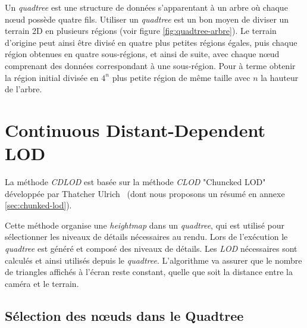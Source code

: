  Un \emph{quadtree} est une structure de données s'apparentant à un arbre où chaque n\oe{}ud possède quatre fils. Utiliser un \emph{quadtree} est un bon moyen de diviser un terrain 2D en plusieurs régions (voir figure \ref{fig:quadtree-arbre}). Le terrain d'origine peut ainsi être divisé en quatre plus petites régions égales, puis chaque région obtenues en quatre sous-régions, et ainsi de suite, avec chaque n\oe{}ud comprenant des données correspondant à une sous-région. Pour à terme obtenir la région initial divisée en $4^n$ plus petite région de même taille avec $n$ la hauteur de l'arbre.

  
\vspace{1.5cm}

\section{Continuous Distant-Dependent LOD}


  La méthode \textit{CDLOD} est basée sur la méthode \textit{CLOD} "Chuncked LOD" développée par Thatcher Ulrich~\cite{CLOD} (dont nous proposons un résumé en annexe \ref{sec:chunked-lod}).
  

  Cette méthode organise une \emph{heightmap} dans un \emph{quadtree}, qui est utilisé pour sélectionner les niveaux de détails nécessaires au rendu. Lors de l'exécution le \emph{quadtree} est généré et composé des niveaux de détails. Les \emph{LOD} nécessaires sont calculés et ainsi utilisés depuis le \emph{quadtree}. L'algorithme va assurer que le nombre de triangles affichés à l'écran reste constant, quelle que soit la distance entre la caméra et le terrain.
  
 \subsection{Sélection des n\oe{}uds dans le Quadtree}
 
